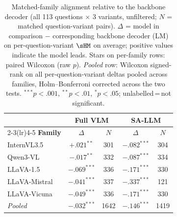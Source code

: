 \begin{table}[ht]
\centering\small\setlength{\tabcolsep}{5pt}
\begin{tabular}{l cc cc}
\toprule
& \multicolumn{2}{c}{\textbf{Full VLM}} & \multicolumn{2}{c}{\textbf{SA-LLM}} \\
\cmidrule(lr){2-3}\cmidrule(lr){4-5}
\textbf{Family} & $\Delta$ & $N$ & $\Delta$ & $N$ \\
\midrule
InternVL3.5 & $+.021^{**}$ & 301 & $-.082^{***}$ & 304 \\
Qwen3-VL & $-.017^{**}$ & 332 & $-.087^{***}$ & 334 \\
LLaVA-1.5 & $-.069^{***}$ & 336 & $-.171^{***}$ & 330 \\
LLaVA-Mistral & $-.041^{***}$ & 337 & $-.337^{***}$ & 121 \\
LLaVA-Vicuna & $-.049^{***}$ & 336 & $-.171^{***}$ & 330 \\
\midrule
\textit{Pooled} & $-.032^{***}$ & 1642 & $-.146^{***}$ & 1419 \\
\bottomrule
\end{tabular}
\caption{Matched-family alignment relative to the backbone decoder (all 113 questions $\times$ 3 variants, unfiltered; $N$ = matched question-variant pairs).
$\Delta$ = model in comparison $-$ corresponding backbone decoder (LM) on per-question-variant $\sHM$ on average; positive values indicate the model leads.
Stars on per-family rows: paired Wilcoxon (raw $p$). \textit{Pooled} row: Wilcoxon signed-rank on all per-question-variant deltas pooled across families, Holm--Bonferroni corrected across the two tests. ${}^{***}p{<}.001$, ${}^{**}p{<}.01$, ${}^{*}p{<}.05$; unlabelled\,=\,not significant.}
\label{tab:matched_family_alignment_tests_raw}
\end{table}